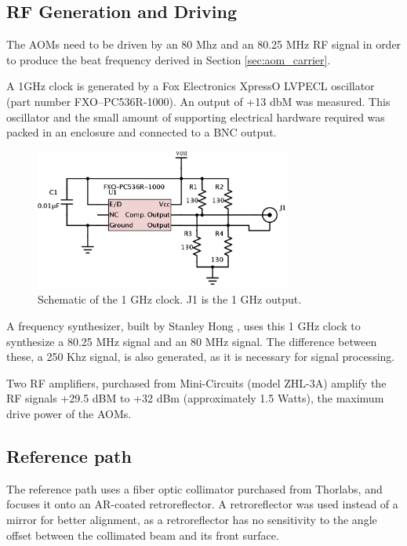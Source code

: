 \subsection{RF Generation and Driving}

The AOMs need to be driven by an 80 Mhz and an 80.25 MHz RF signal in order to produce the beat frequency derived in Section \ref{sec:aom_carrier}.

A 1GHz clock is generated by a Fox Electronics XpressO LVPECL oscillator (part number FXO–PC536R-1000). An output of +13 dbM was measured. This oscillator and the small amount of supporting electrical hardware required was packed in an enclosure and connected to a BNC output.

\begin{figure}[h!]
\centering
\includegraphics[width=0.75\textwidth]{Images/Schematics/1ghzclock_2.png}
\caption{Schematic of the 1 GHz clock. J1 is the 1 GHz output.}
\end{figure}

A frequency synthesizer, built by Stanley Hong \cite{hong}, uses this 1 GHz clock to synthesize a 80.25 MHz signal and an 80 MHz signal. The difference between these, a 250 Khz signal, is also generated, as it is necessary for signal processing.

Two RF amplifiers, purchased from Mini-Circuits (model ZHL-3A) amplify the RF signals +29.5 dBM to +32 dBm (approximately 1.5 Watts), the maximum drive power of the AOMs.

\subsection{Reference path}


The reference path uses a fiber optic collimator purchased from Thorlabs, and focuses it onto an AR-coated retroreflector. A retroreflector was used instead of a mirror for better alignment, as a retroreflector has no sensitivity to the angle offset between the collimated beam and its front surface.

